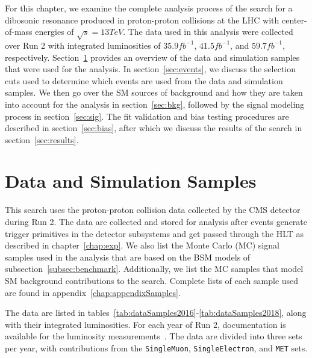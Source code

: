 For this chapter, we examine the complete analysis process of the search for a dibosonic resonance produced in proton-proton collisions at the LHC with center-of-mass energies of $\sqrt{s}=13\unit{TeV}$.
The data used in this analysis were collected over Run 2 with integrated luminosities of $35.9\unit{fb^{-1}}$, $41.5\unit{fb^{-1}}$, and $59.7\unit{fb^{-1}}$, respectively.
Section~\ref{sec:samples} provides an overview of the data and simulation samples that were used for the analysis.
In section~\ref{sec:events}, we discuss the selection cuts used to determine which events are used from the data and simulation samples.
We then go over the SM sources of background and how they are taken into account for the analysis in section~\ref{sec:bkg}, followed by the signal modeling process in section~\ref{sec:sig}.
The fit validation and bias testing procedures are described in section~\ref{sec:bias}, after which we discuss the results of the search in section~\ref{sec:results}.

\section{Data and Simulation Samples}
\label{sec:samples}

This search uses the proton-proton collision data collected by the CMS detector during Run 2.
The data are collected and stored for analysis after events generate trigger primitives in the detector subsystems and get passed through the HLT as described in chapter~\ref{chap:exp}.
We also list the Monte Carlo (MC) signal samples used in the analysis that are based on the BSM models of subsection~\ref{subsec:benchmark}.
Additionally, we list the MC samples that model SM background contributions to the search.
Complete lists of each sample used are found in appendix~\ref{chap:appendixSamples}.

The data are listed in tables~\ref{tab:dataSamples2016}-\ref{tab:dataSamples2018}, along with their integrated luminosities.
For each year of Run 2, documentation is available for the luminosity measurements~\cite{CMS-PAS-LUM-17-001,CMS-PAS-LUM-17-004,CMS-PAS-LUM-18-002}.
The data are divided into three sets per year, with contributions from the \texttt{SingleMuon}, \texttt{SingleElectron}, and \texttt{MET} sets.

